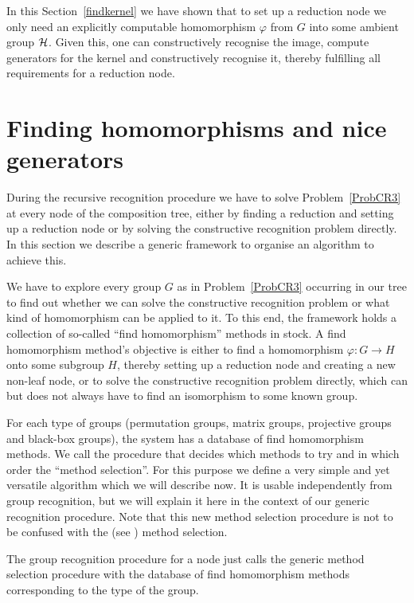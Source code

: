 In this Section~\ref{findkernel} 
we have shown that to set up a reduction node we only need
an explicitly computable homomorphism $\varphi$ from $G$ into some
ambient group $\mathcal{H}$. Given this, one can constructively recognise the
image, compute generators for the kernel and constructively recognise it,
thereby fulfilling all requirements for a reduction node.


\section{Finding homomorphisms and nice generators}
\label{findhom}
%

During the recursive recognition procedure we have to solve
Problem~\ref{ProbCR3} at every node of the composition tree, either
by finding a reduction and setting up a reduction node or by solving 
the constructive recognition problem directly. In this section we describe
a generic framework to organise an algorithm to achieve this.

We have to explore every group $G$ as in Problem~\ref{ProbCR3} 
occurring in our tree to find out whether we 
can solve the constructive recognition 
problem or what kind of homomorphism can be 
applied to it. To this end, the framework holds a collection
of so-called ``find homomorphism'' methods in stock. A find homomorphism
method's objective is either to find a homomorphism $\varphi: G \to H$
onto some subgroup $H$, thereby setting up a reduction node and 
creating a new non-leaf node, or to
solve the constructive recognition 
problem directly, which can but does not always have to find
an isomorphism to some known group.

For each type of groups (permutation groups, matrix groups, projective
groups and black-box
groups), the system has a database of find homomorphism methods.
We call the procedure that decides which methods to try and in which order 
the ``method selection''. For this purpose we define a very simple and yet 
versatile algorithm which we will describe now. It is usable independently
from group recognition, but we will explain it here in the context of
our generic recognition procedure. Note that this new method selection
procedure is not to be confused with the {\GAP} (see \cite{GAP4}) method
selection. 
%

The group recognition procedure for a node just calls the generic method
selection procedure with the database of find homomorphism methods
corresponding to the type of the group.

